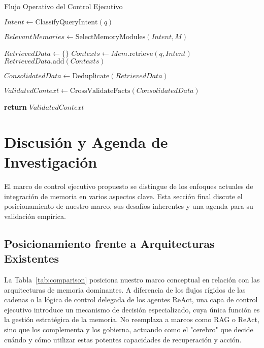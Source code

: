 \documentclass[conference]{IEEEtran}
\begin{document}
\begin{algorithm}[h!]
\caption{Flujo Operativo del Control Ejecutivo}
\label{alg:control_flow}
\begin{algorithmic}[1]
        \Statex {}
        \State $Intent \gets \text{ClassifyQueryIntent}(q)$
        
        \Statex {}
        \State $RelevantMemories \gets \text{SelectMemoryModules}(Intent, M)$
        
        \Statex {}
        \State $RetrievedData \gets \{\}$
            \State $Contexts \gets Mem.\text{retrieve}(q, Intent)$
            \State $RetrievedData.\text{add}(Contexts)$
        \EndFor
        
        \Statex {}
        \State $ConsolidatedData \gets \text{Deduplicate}(RetrievedData)$
        
        \Statex {}
        \State $ValidatedContext \gets \text{CrossValidateFacts}(ConsolidatedData)$
        
        \Statex {}
        \State \textbf{return} $ValidatedContext$
    \EndProcedure
\end{algorithmic}
\end{algorithm}


\section{Discusión y Agenda de Investigación}

El marco de control ejecutivo propuesto se distingue de los enfoques actuales de integración de memoria en varios aspectos clave. Esta sección final discute el posicionamiento de nuestro marco, sus desafíos inherentes y una agenda para su validación empírica.

\subsection{Posicionamiento frente a Arquitecturas Existentes}
La Tabla~\ref{tab:comparison} posiciona nuestro marco conceptual en relación con las arquitecturas de memoria dominantes. A diferencia de los flujos rígidos de las cadenas o la lógica de control delegada de los agentes ReAct, una capa de control ejecutivo introduce un mecanismo de decisión especializado, cuya única función es la gestión estratégica de la memoria. No reemplaza a marcos como RAG o ReAct, sino que los complementa y los gobierna, actuando como el "cerebro" que decide cuándo y cómo utilizar estas potentes capacidades de recuperación y acción.
\end{document}
